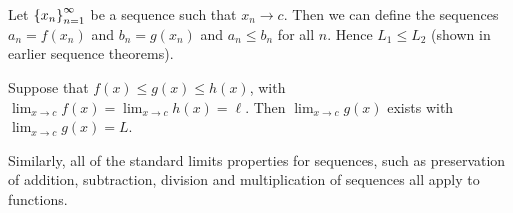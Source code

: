 \documentclass[12pt]{article}
\theoremstyle{definition}
\renewenvironment{proof}[1][\proofname]{\vspace{-10pt}\begin{replacementproof}}{\end{replacementproof}}
\newcommand{\xn}{\set{x_{n}}_{n = 1}^{\infty}}
\newcommand{\xlim}{\lim_{x \rightarrow c}}
\begin{document}
            \begin{proof}
                Let $\xn$ be a sequence such that $x_{n} \rightarrow c$. Then we can define the sequences $a_{n} = f(x_{n})$ and $b_{n} = g(x_{n})$ and $a_{n} \leq b_{n}$ for all $n$. Hence $L_{1} \leq L_{2}$ (shown in earlier sequence theorems).
            \end{proof}
            \begin{corollary}
                Suppose that $f(x) \leq g(x) \leq h(x)$, with $\xlim f(x) = \xlim h(x) = \ell$. Then $\xlim g(x)$ exists with $\xlim g(x) = L$.
            \end{corollary}
            \begin{remark}
                Similarly, all of the standard limits properties for sequences, such as preservation of addition, subtraction, division and multiplication of sequences all apply to functions.
            \end{remark}
\end{document}
